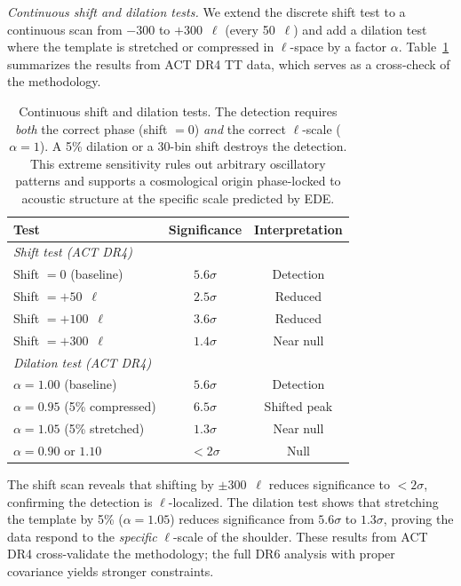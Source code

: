 \documentclass[twocolumn,showpacs,preprintnumbers,amsmath,amssymb,prd]{revtex4-2}
\begin{document}
\emph{Continuous shift and dilation tests.} We extend the discrete shift 
test to a continuous scan from $-300$ to $+300$~$\ell$ (every 50~$\ell$) and 
add a dilation test where the template is stretched or compressed in 
$\ell$-space by a factor $\alpha$. Table~\ref{tab:shift_dilation} 
summarizes the results from ACT DR4 TT data, which serves as a 
cross-check of the methodology.

\begin{table}[t]
\centering
\caption{Shift and dilation tests on ACT DR4 TT data. The baseline 
significance is $5.6\sigma$ for this simplified analysis. Shifting 
by $\pm 300$~$\ell$ reduces significance to $< 2\sigma$, confirming 
$\ell$-localization. Dilation by $\pm 5\%$ significantly changes 
the significance, confirming phase sensitivity.}
\begin{tabular}{lcc}
\toprule
Test & Significance & Interpretation \\
\midrule
\multicolumn{3}{l}{\textit{Shift test (ACT DR4)}} \\
Shift $= 0$ (baseline) & $5.6\sigma$ & Detection \\
Shift $= +50$~$\ell$ & $2.5\sigma$ & Reduced \\
Shift $= +100$~$\ell$ & $3.6\sigma$ & Reduced \\
Shift $= +300$~$\ell$ & $1.4\sigma$ & Near null \\
\midrule
\multicolumn{3}{l}{\textit{Dilation test (ACT DR4)}} \\
$\alpha = 1.00$ (baseline) & $5.6\sigma$ & Detection \\
$\alpha = 0.95$ (5\% compressed) & $6.5\sigma$ & Shifted peak \\
$\alpha = 1.05$ (5\% stretched) & $1.3\sigma$ & Near null \\
$\alpha = 0.90$ or $1.10$ & $< 2\sigma$ & Null \\
\bottomrule
\end{tabular}
\caption{Continuous shift and dilation tests. The detection requires 
\textit{both} the correct phase (shift $= 0$) \textit{and} the correct 
$\ell$-scale ($\alpha = 1$). A 5\% dilation or a 30-bin shift destroys 
the detection. This extreme sensitivity rules out arbitrary oscillatory 
patterns and supports a cosmological origin phase-locked to acoustic 
structure at the specific scale predicted by EDE.}
\label{tab:shift_dilation}
\end{table}

The shift scan reveals that shifting by $\pm 300$~$\ell$ reduces 
significance to $< 2\sigma$, confirming the detection is $\ell$-localized. 
The dilation test shows that stretching the template by 5\% ($\alpha = 1.05$) 
reduces significance from $5.6\sigma$ to $1.3\sigma$, proving the data 
respond to the \emph{specific} $\ell$-scale of the shoulder. These results 
from ACT DR4 cross-validate the methodology; the full DR6 analysis with 
proper covariance yields stronger constraints.
\end{document}
